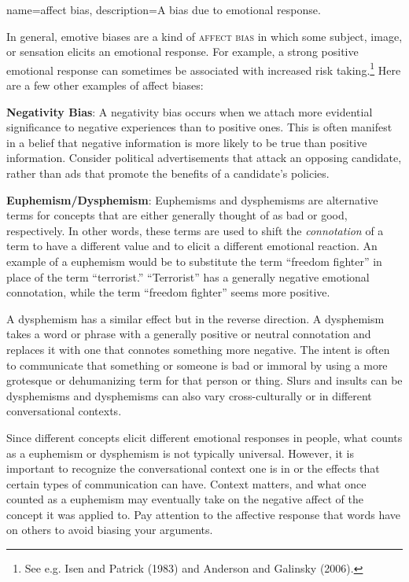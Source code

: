 {
name=affect bias,
description={A bias due to emotional response.}
}

In general, emotive biases are a kind of \textsc{\gls{affect bias}} in which some subject, image, or sensation elicits an emotional response. For example, a strong positive emotional response can sometimes be associated with increased risk taking.\footnote{See e.g. Isen and Patrick (1983) and Anderson and Galinsky (2006).} Here are a few other examples of affect biases:

\textbf{Negativity Bias}: A negativity bias occurs when we attach more evidential significance to negative experiences than to positive ones. This is often manifest in  a belief that negative information is more likely to be true than positive information. Consider political advertisements that attack an opposing candidate, rather than ads that promote the benefits of a candidate's policies.

\textbf{Euphemism/Dysphemism}: Euphemisms and dysphemisms are alternative terms for concepts that are either generally thought of as bad or good, respectively. In other words, these terms are used to shift the \emph{connotation} of a term to have a different value and to elicit a different emotional reaction. An example of a euphemism would be to substitute the term ``freedom fighter'' in place of the term ``terrorist.'' ``Terrorist'' has a generally negative emotional connotation, while the term ``freedom fighter'' seems more positive.

A dysphemism has a similar effect but in the reverse direction. A dysphemism takes a word or phrase with a generally positive or neutral connotation and replaces it with one that connotes something more negative. The intent is often to communicate that something or someone is bad or immoral by using a more grotesque or dehumanizing term for that person or thing. Slurs and insults can be dysphemisms and dysphemisms can also vary cross-culturally or in different conversational contexts.

Since different concepts elicit different emotional responses in people, what counts as a euphemism or dysphemism is not typically universal. However, it is important to recognize the conversational context one is in or the effects that certain types of communication can have. Context matters, and what once counted as a euphemism may eventually take on the negative affect of the concept it was applied to. Pay attention to the affective response that words have on others to avoid biasing your arguments.

